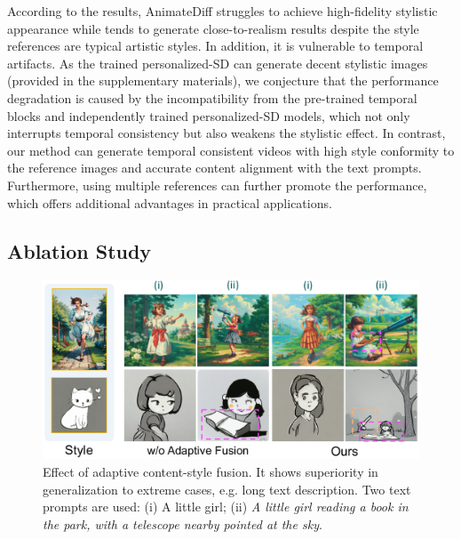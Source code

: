 According to the results, AnimateDiff struggles to achieve high-fidelity stylistic appearance while tends to generate close-to-realism results despite the style references are typical artistic styles. In addition, it is vulnerable to temporal artifacts. As the trained personalized-SD can generate decent stylistic images (provided in the supplementary materials), we conjecture that the performance degradation is caused by the incompatibility from the pre-trained temporal blocks and independently trained personalized-SD models, which not only interrupts temporal consistency but also weakens the stylistic effect.
In contrast, our method can generate temporal consistent videos with high style conformity to the reference images and accurate content alignment with the text prompts. Furthermore, using multiple references can further promote the performance, which offers additional advantages in practical applications.


\subsection{Ablation Study}
\label{subsec:ablation}

\begin{figure}[!t]
    \centering
    \includegraphics[width=\linewidth]{figures/ablation_no_scale.pdf
    }
    \vspace{-2em}
    \caption{Effect of adaptive content-style fusion. It shows superiority in generalization to extreme cases, e.g. long text description. Two text prompts are used: (i) A little girl; (ii) \textit{A little girl \textcolor[RGB]{255, 64, 255}{reading a book} in the park, with \textcolor[RGB]{244, 177, 131}{a telescope} nearby pointed at the sky}.}
    \label{fig:ablation_no_fusion}
    \vspace{-0.7em}
\end{figure}

